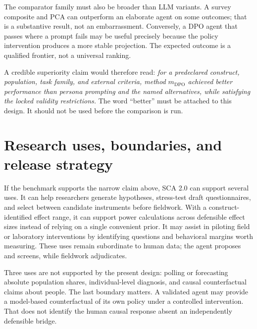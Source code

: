 \documentclass[10pt,letterpaper]{article}
\begin{document}
The comparator family must also be broader than LLM variants. A survey composite and PCA can outperform an elaborate agent on some outcomes; that is a substantive result, not an embarrassment. Conversely, a DPO agent that passes where a prompt fails may be useful precisely because the policy intervention produces a more stable projection. The expected outcome is a qualified frontier, not a universal ranking.

A credible superiority claim would therefore read: \emph{for a predeclared construct, population, task family, and external criteria, method $m_{\mathrm{DPO}}$ achieved better performance than persona prompting and the named alternatives, while satisfying the locked validity restrictions.} The word ``better'' must be attached to this design. It should not be used before the comparison is run.

\section{Research uses, boundaries, and release strategy}
If the benchmark supports the narrow claim above, SCA 2.0 can support several uses. It can help researchers generate hypotheses, stress-test draft questionnaires, and select between candidate instruments before fieldwork. With a construct-identified effect range, it can support power calculations across defensible effect sizes instead of relying on a single convenient prior. It may assist in piloting field or laboratory interventions by identifying questions and behavioral margins worth measuring. These uses remain subordinate to human data; the agent proposes and screens, while fieldwork adjudicates.

Three uses are not supported by the present design: polling or forecasting absolute population shares, individual-level diagnosis, and causal counterfactual claims about people. The last boundary matters. A validated agent may provide a model-based counterfactual of its own policy under a controlled intervention. That does not identify the human causal response absent an independently defensible bridge.
\end{document}
